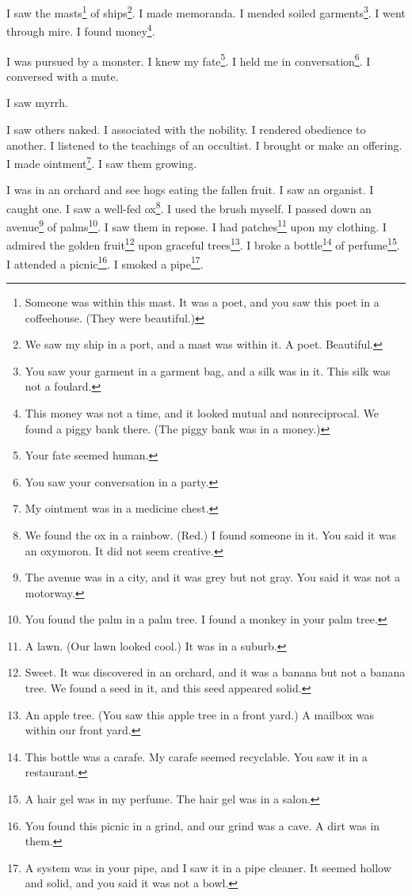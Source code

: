 \documentclass[12pt]{book}
\begin{document}
 I saw the masts\footnote{Someone was within this mast. It was a poet, and you saw this poet in a coffeehouse. (They were beautiful.)} of ships\footnote{We saw my ship in a port, and a mast was within it. A poet. Beautiful.}. I made memoranda. I mended soiled garments\footnote{You saw your garment in a garment bag, and a silk was in it. This silk was not a foulard.}. I went through mire. I found money\footnote{This money was not a time, and it looked mutual and nonreciprocal. We found a piggy bank there. (The piggy bank was in a money.)}. 

 I was pursued by a monster. I knew my fate\footnote{Your fate seemed human.}. I held me in conversation\footnote{You saw your conversation in a party.}. I conversed with a mute. 

 I saw myrrh. 

 I saw others naked. I associated with the nobility. I rendered obedience to another. I listened to the teachings of an occultist. I brought or make an offering. I made ointment\footnote{My ointment was in a medicine chest.}. I saw them growing. 

 I was in an orchard and see hogs eating the fallen fruit. I saw an organist. I caught one. I saw a well-fed ox\footnote{We found the ox in a rainbow. (Red.) I found someone in it. You said it was an oxymoron. It did not seem creative.}. I used the brush myself. I passed down an avenue\footnote{The avenue was in a city, and it was grey but not gray. You said it was not a motorway.} of palms\footnote{You found the palm in a palm tree. I found a monkey in your palm tree.}. I saw them in repose. I had patches\footnote{A lawn. (Our lawn looked cool.) It was in a suburb.} upon my clothing. I admired the golden fruit\footnote{Sweet. It was discovered in an orchard, and it was a banana but not a banana tree. We found a seed in it, and this seed appeared solid.} upon graceful trees\footnote{An apple tree. (You saw this apple tree in a front yard.) A mailbox was within our front yard.}. I broke a bottle\footnote{This bottle was a carafe. My carafe seemed recyclable. You saw it in a restaurant.} of perfume\footnote{A hair gel was in my perfume. The hair gel was in a salon.}. I attended a picnic\footnote{You found this picnic in a grind, and our grind was a cave. A dirt was in them.}. I smoked a pipe\footnote{A system was in your pipe, and I saw it in a pipe cleaner. It seemed hollow and solid, and you said it was not a bowl.}. 
\end{document}
